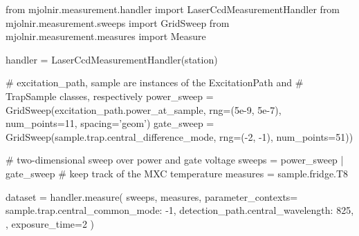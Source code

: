 \begin{listing}[htpb]
    \begin{py}
        from mjolnir.measurement.handler import LaserCcdMeasurementHandler
        from mjolnir.measurement.sweeps import GridSweep
        from mjolnir.measurement.measures import Measure

        handler = LaserCcdMeasurementHandler(station)

        # excitation_path, sample are instances of the ExcitationPath and
        # TrapSample classes, respectively
        power_sweep = GridSweep(excitation_path.power_at_sample,
                                rng=(5e-9, 5e-7), num_points=11,
                                spacing='geom')
        gate_sweep = GridSweep(sample.trap.central_difference_mode,
                               rng=(-2, -1), num_points=51))

        # two-dimensional sweep over power and gate voltage
        sweeps = power_sweep | gate_sweep
        # keep track of the MXC temperature
        measures = sample.fridge.T8

        dataset = handler.measure(
            sweeps,
            measures,
            parameter_contexts={
                sample.trap.central_common_mode: -1,
                detection_path.central_wavelength: 825,
            },
            exposure_time=2
        )
    \end{py}
    \caption[\mjolnir measurement workflow]{
    Setup and measurement workflow using the \mjolnir package.
         is a \qcodes {} object managing the instruments.
        The  object describes a nested loop on whose inner iteration the difference mode parameter of the trap's central gate is swept over a linear grid and on whose outer iteration the laser power, adjusted for the \acrlong{bs} ratio, is swept over a logarithmically spaced grid.
        No dependent parameters ( objects) need to be explicitly specified as the  measures the \gls{ccd} spectrum as well as laser power and leakage currents of the swept gates by default.
        The  argument is used to set the spectrometer wavelength to \qty{825}{\nano\meter} and the common mode voltage of the active trap to \qty{-1}{\volt}.
        The  argument is passed through to the  method, where it is used to set up the \gls{ccd} for acquisition.
    }
    \label{lst:exp:mjolnir:workflow}
\end{listing}

